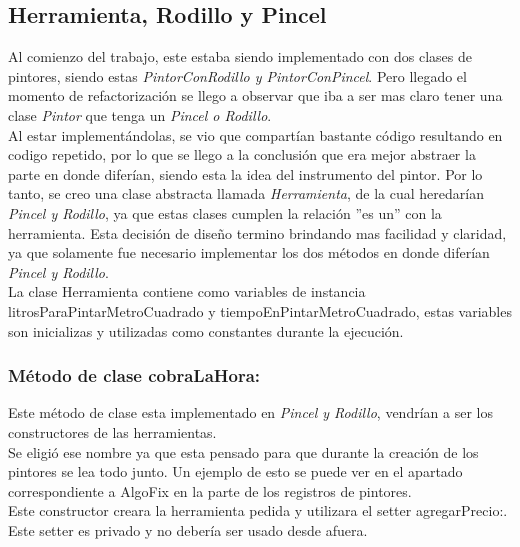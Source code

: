 \documentclass[titlepage,a4paper]{article}
\begin{document}
\subsection{Herramienta, Rodillo y Pincel}
Al comienzo del trabajo, este estaba siendo implementado con dos clases de pintores, siendo estas \textit{PintorConRodillo y PintorConPincel}. Pero llegado el momento de refactorización se llego a observar que iba a ser mas claro tener una clase \textit{Pintor} que tenga un \textit{Pincel o Rodillo}. \\
\indent Al estar implementándolas, se vio que compartían bastante código resultando en codigo repetido, por lo que se llego a la conclusión que era mejor abstraer la parte en donde diferían, siendo esta la idea del instrumento del pintor. Por lo tanto, se creo una clase abstracta llamada \textit{Herramienta}, de la cual heredarían \textit{Pincel y Rodillo}, ya que estas clases cumplen la relación ''es un'' con la herramienta. Esta decisión de diseño termino brindando mas facilidad y claridad, ya que solamente fue necesario implementar los dos métodos en donde diferían \textit{Pincel y Rodillo}.\\
\indent La clase Herramienta contiene como variables de instancia litrosParaPintarMetroCuadrado y tiempoEnPintarMetroCuadrado, estas variables son inicializas y utilizadas como constantes durante la ejecución.
\medskip

\subsubsection*{Método de clase cobraLaHora:}
\indent Este método de clase esta implementado en \textit{Pincel y Rodillo}, vendrían a ser los constructores de las herramientas.\\
\indent Se eligió ese nombre ya que esta pensado para que durante la creación de los pintores se lea todo junto. Un ejemplo de esto se puede ver en el apartado correspondiente a AlgoFix en la parte de los registros de pintores.\\
\indent Este constructor creara la herramienta pedida y utilizara el setter agregarPrecio:.
Este setter es privado y no debería ser usado desde afuera.\\
\medskip
\end{document}
